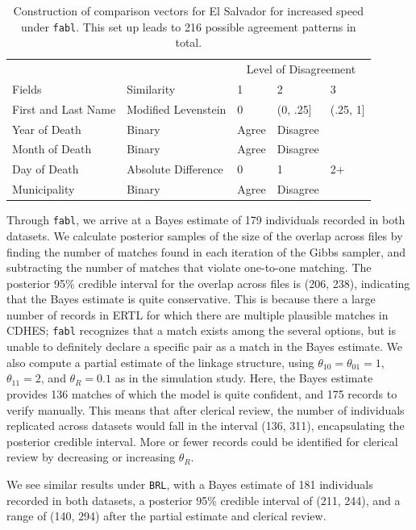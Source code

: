 \documentclass[ba]{imsart}
\begin{document}
\begin{table}
	\centering
	\begin{tabular}[t]{lllll}
		\hline
		\multicolumn{2}{c}{ } & \multicolumn{3}{c}{Level of Disagreement} \\
		\cline{3-5}
		Fields & Similarity & 1 & 2 & 3\\
		\hline
		First and Last Name & Modified Levenstein & 0 & (0, .25] & (.25, 1]\\
		Year of Death & Binary & Agree & Disagree & \\
		Month of Death & Binary & Agree & Disagree & \\
		Day of Death & Absolute Difference & 0 & 1 & 2+\\
		Municipality & Binary & Agree & Disagree & \\
		\hline
	\end{tabular}
	\caption{Construction of comparison vectors for El Salvador for increased speed under \texttt{fabl}. This set up leads to 216 possible agreement patterns in total.}\label{Tab:el_salvador_cutoffs_2}
\end{table}

Through \texttt{fabl}, we arrive at a Bayes estimate of 179 individuals recorded in both datasets. We calculate posterior samples of the size of the overlap across files by finding the number of matches found in each iteration of the Gibbs sampler, and subtracting the number of matches that violate one-to-one matching. The posterior 95\% credible interval for the overlap across files is (206, 238), indicating that the Bayes estimate is quite conservative. This is because there a large number of records in ERTL for which there are multiple plausible matches in CDHES; \texttt{fabl} recognizes that a match exists among the several options, but is unable to definitely declare a specific pair as a match in the Bayes estimate. We also compute a partial estimate of the linkage structure, using $\theta_{10} = \theta_{01} = 1$, $\theta_{11} = 2$, and $\theta_R = 0.1$ as in the simulation study. Here, the Bayes estimate provides 136 matches of which the model is quite confident, and 175 records to verify manually. This means that after clerical review, the number of individuals replicated across datasets would fall in the interval (136, 311), encapsulating the posterior credible interval. More or fewer records could be identified for clerical review by decreasing or increasing $\theta_R$. 

We see similar results under \texttt{BRL}, with a Bayes estimate of 181 individuals recorded in both datasets, a posterior 95\% credible interval of (211, 244), and a range of (140, 294) after the partial estimate and clerical review. 
\end{document}
